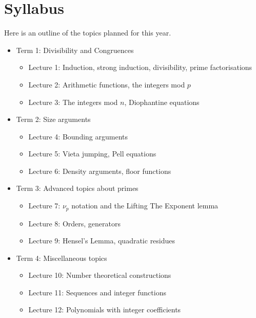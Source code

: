 \documentclass{article}
\begin{document}
\section{Syllabus}
Here is an outline of the topics planned for this year.
\begin{itemize}
	\item Term 1: Divisibility and Congruences
	      \begin{itemize}
		      \item Lecture 1: Induction, strong induction, divisibility, prime
		            factorisations
		      \item Lecture 2: Arithmetic functions, the integers mod $p$
		      \item Lecture 3: The integers mod $n$, Diophantine equations
	      \end{itemize}
	\item Term 2: Size arguments
	      \begin{itemize}
		      \item Lecture 4: Bounding arguments
		      \item Lecture 5: Vieta jumping, Pell equations
		      \item Lecture 6: Density arguments, floor functions
	      \end{itemize}
	\item Term 3: Advanced topics about primes
	      \begin{itemize}
		      \item Lecture 7: $\nu_p$ notation and the Lifting The Exponent lemma
		      \item Lecture 8: Orders, generators
		      \item Lecture 9: Hensel's Lemma, quadratic residues
	      \end{itemize}
	\item Term 4: Miscellaneous topics
	      \begin{itemize}
		      \item Lecture 10: Number theoretical constructions
		      \item Lecture 11: Sequences and integer functions
		      \item Lecture 12: Polynomials with integer coefficients
	      \end{itemize}
\end{itemize}
\end{document}
